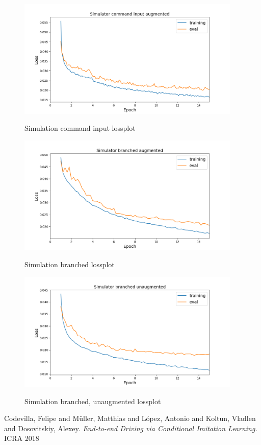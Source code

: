 \documentclass[a4paper]{article}
\begin{document}
\begin{figure}[!htbp]
  \centering
  \includegraphics[width=0.95\textwidth]{figures/sim_command_input_aug_lossplot}
  \label{fig:augmented_command_loss}
  \caption{Simulation command input lossplot}
\end{figure}

\begin{figure}[!htbp]
  \centering
  \includegraphics[width=0.95\textwidth]{figures/sim_branched_aug_lossplot}
  \label{fig:augmented_branched_loss}
  \caption{Simulation branched lossplot}
\end{figure}

\begin{figure}[!htbp]
  \centering
  \includegraphics[width=0.95\textwidth]{figures/sim_branched_nonaug_lossplot}
  \label{fig:unaugmented_branched_loss}
  \caption{Simulation branched, unaugmented lossplot}
\end{figure}
	
\begin{thebibliography}{9}
Codevilla, Felipe and Müller, Matthias and López, Antonio and Koltun, Vladlen
and Dosovitskiy, Alexey.
\textit{End-to-end Driving via Conditional Imitation Learning.}
ICRA 2018
\end{thebibliography}
\end{document}
